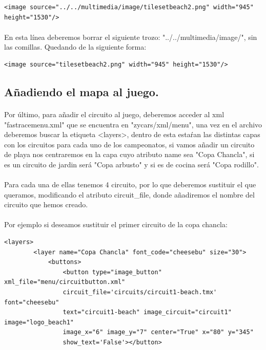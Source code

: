 \begin{lstlisting}[style=XML]
<image source="../../multimedia/image/tilesetbeach2.png" width="945" height="1530"/>
\end{lstlisting}

\paragraph{}
En esta línea deberemos borrar el siguiente trozo: "../../multimedia/image/", sin las comillas. Quedando de la siguiente forma:

\begin{lstlisting}[style=XML]
<image source="tilesetbeach2.png" width="945" height="1530"/>
\end{lstlisting}

\subsection{Añadiendo el mapa al juego.}

\paragraph{}
Por último, para añadir el circuito al juego, deberemos acceder al xml "fastracemenu.xml" que se encuentra en 
"zycars/xml/menu", una vez en el archivo deberemos buscar la etiqueta <layers>, dentro de esta estaŕan las distintas capas
con los circuitos para cada uno de los campeonatos, si vamos añadir un circuito de playa nos centraremos en la capa cuyo atributo
name sea "Copa Chancla", si es un circuito de jardin será "Copa arbusto" y si es de cocina será "Copa rodillo".

\paragraph{}
Para cada una de ellas tenemos 4 circuito, por lo que deberemos sustituir el que queramos, modificando el atributo circuit\_file,
donde añadiremos el nombre del circuito que hemos creado. 

\paragraph{}
Por ejemplo si deseamos sustituir el primer circuito de la copa chancla:

\begin{lstlisting}[style=XML]
    <layers>
        <layer name="Copa Chancla" font_code="cheesebu" size="30">
            <buttons>
                <button type="image_button" xml_file="menu/circuitbutton.xml" 
                circuit_file='circuits/circuit1-beach.tmx' font="cheesebu" 
                text="circuit1-beach" image_circuit="circuit1" image="logo_beach1" 
                image_x="6" image_y="7" center="True" x="80" y="345" 
                show_text='False'></button>
\end{lstlisting}

